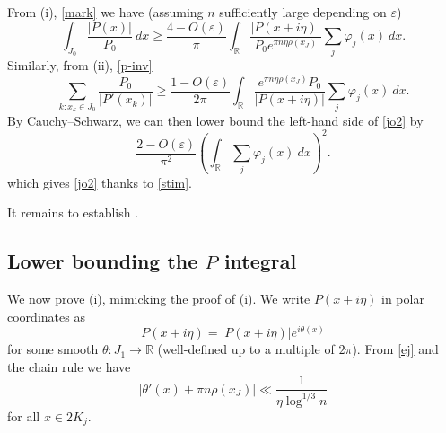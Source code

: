 \documentclass[12pt]{amsart}
\newcommand{\eps}{\varepsilon}
\newcommand{\R}{\mathbb{R}}
\begin{document}
From (i), \eqref{mark} we have (assuming $n$ sufficiently large depending on $\eps$)
$$ \int_{J_0} \frac{|P(x)|}{P_0}\ dx \geq \frac{4 - O(\eps)}{\pi} \int_\R \frac{|P(x+i\eta)|}{P_0 e^{\pi n \eta \rho(x_J)}} \sum_j \varphi_j(x)\ dx.$$
Similarly, from (ii), \eqref{p-inv}
$$ \sum_{k: x_k \in J_0} \frac{P_0}{|P'(x_k)|} \geq \frac{1 - O(\eps)}{2\pi} \int_\R \frac{e^{\pi n \eta \rho(x_J)} P_0}{|P(x+i\eta)|} \sum_j \varphi_j(x)\ dx.$$
By Cauchy--Schwarz, we can then lower bound the left-hand side of \eqref{jo2} by
$$
\frac{2 - O(\eps)}{\pi^2} \left( \int_\R \sum_j \varphi_j(x)\ dx \right)^2.$$
which gives \eqref{jo2} thanks to \eqref{stim}.

It remains to establish .

\subsection{Lower bounding the \texorpdfstring{$P$}{P} integral}

We now prove (i), mimicking the proof of (i).  We write $P(x+i\eta)$ in polar coordinates as
\begin{equation}\label{polar}
    P(x+i\eta) = |P(x+i\eta)| e^{i\theta(x)}
\end{equation}
for some smooth $\theta \colon J_1 \to \R$ (well-defined up to a multiple of $2\pi$).  From \eqref{ej} and the chain rule we have
\begin{equation}\label{thet} |\theta'(x) + \pi n \rho(x_J)| \ll \frac{1}{\eta \log^{1/3} n}
\end{equation}
for all $x \in 2K_j$.
\end{document}
